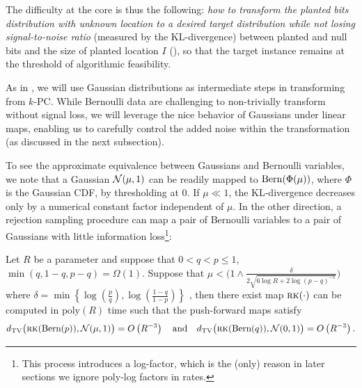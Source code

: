 \documentclass[final,12pt]{colt2023} %
\newcommand\1[1]{\mathbb{I}_{\left\{#1\right\}}}
\begin{document}
The difficulty at the core is thus the following: 
\emph{how to transform the planted bits distribution with unknown location to a desired target distribution while not losing signal-to-noise ratio} (measured by the KL-divergence) between planted and null bits and the size of planted location $I$ (\cite{BBH19}), so that the target instance remains at the threshold of algorithmic feasibility. 


As in \cite{BB20}, we will use Gaussian distributions as intermediate steps in transforming from $k$-PC. While Bernoulli data are challenging to non-trivially transform without signal loss, we will leverage the nice behavior of Gaussians under linear maps, enabling us to carefully control the added noise within the transformation (as discussed in the next subsection). 

To see the approximate equivalence between Gaussians and Bernoulli variables, we note that a Gaussian $\mathcal{N}(\mu, 1)$ can be readily mapped to ${\rm Bern}(\Phi(\mu))$, where $\Phi$ is the Gaussian CDF, by thresholding at 0. If $\mu\ll 1$, the KL-divergence decreases only by a numerical constant factor independent of $\mu$. In the other direction, a rejection sampling procedure can map a pair of Bernoulli variables to a pair of Gaussians with little information loss\footnote{This process introduces a log-factor, which is the (only) reason in later sections we ignore poly-log factors in rates.}: 


\begin{lemma} \label{lem:5c}
Let $R$ be a parameter and suppose that $0 < q < p \le 1$, $\min(q, 1 - q, p-q) = \Omega(1)$. Suppose that $\mu< \big(1\land \frac{\delta}{2 \sqrt{6\log R + 2\log (p-q)^{-1}}}\big)$ where $\delta = \min \left\{ \log \left( \frac{p}{q} \right), \log \left( \frac{1 - q}{1 - p} \right) \right\}$ , then there exist map $\textsc{rk}(\cdot)$ can be computed in $\text{poly}(R)$ time such that the push-forward maps satisfy
$$d_{\rm TV}\big(\textsc{rk}( \textnormal{Bern}(p)),  \mathcal{N}(\mu, 1) \big) = O\left(R^{-3}\right) \quad \text{and}\quad
d_{\rm TV}\big(\textsc{rk}( \textnormal{Bern}(q)), \mathcal{N}(0, 1) \big) = O\left(R^{-3}\right).$$
\end{lemma}
\end{document}
